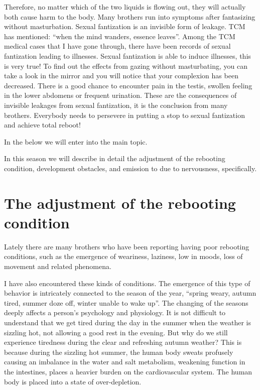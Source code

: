 \documentclass[
]{book}
\begin{document}
Therefore, no matter which of the two liquids is flowing out, they will actually both cause harm to the body. Many brothers run into symptoms after fantasizing without masturbation. Sexual fantization is an invisible form of leakage. TCM has mentioned: ``when the mind wanders, essence leaves''. Among the TCM medical cases that I have gone through, there have been records of sexual fantization leading to illnesses. Sexual fantization is able to induce illnesses, this is very true! To find out the effects from gazing without masturbating, you can take a look in the mirror and you will notice that your complexion has been decreased. There is a good chance to encounter pain in the testis, swollen feeling in the lower abdomens or frequent urination. These are the consequences of invisible leakages from sexual fantization, it is the conclusion from many brothers. Everybody needs to persevere in putting a stop to sexual fantization and achieve total reboot!

In the below we will enter into the main topic.

In this season we will describe in detail the adjustment of the rebooting condition, development obstacles, and emission to due to nervousness, specifically.

\hypertarget{the-adjustment-of-the-rebooting-condition}{%
\section{The adjustment of the rebooting condition}\label{the-adjustment-of-the-rebooting-condition}}

Lately there are many brothers who have been reporting having poor rebooting conditions, such as the emergence of weariness, laziness, low in moods, loss of movement and related phenomena.

I have also encountered these kinds of conditions. The emergence of this type of behavior is intricately connected to the season of the year, ``spring weary, autumn tired, summer doze off, winter unable to wake up''. The changing of the seasons deeply affects a person's psychology and physiology. It is not difficult to understand that we get tired during the day in the summer when the weather is sizzling hot, not allowing a good rest in the evening. But why do we still experience tiredness during the clear and refreshing autumn weather? This is because during the sizzling hot summer, the human body sweats profusely causing an imbalance in the water and salt metabolism, weakening function in the intestines, places a heavier burden on the cardiovascular system. The human body is placed into a state of over-depletion.
\end{document}
